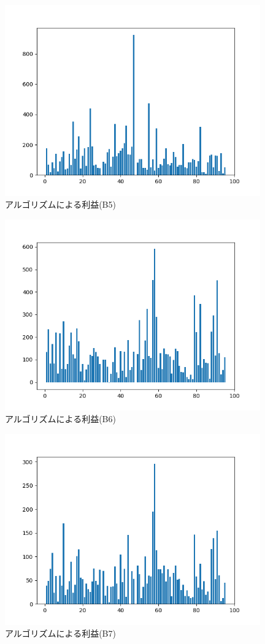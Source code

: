 \begin{figure}[H]
  \centering
  \includegraphics[width=110mm]{fig/macd_nikkeiorfma_saiteki.png}
  \caption{アルゴリズムによる利益(B5)}
  \label{fig:macdfmanksai}
 \end{figure}

 \begin{figure}[H]
  \centering
  \includegraphics[width=110mm]{fig/bbonly_saiteki.png}
  \caption{アルゴリズムによる利益(B6)}
  \label{fig:bbsai}
 \end{figure}

 \begin{figure}[H]
  \centering
  \includegraphics[width=110mm]{fig/bb_fma_saiteki.png}
  \caption{アルゴリズムによる利益(B7)}
  \label{fig:bbfmasai}
 \end{figure}

